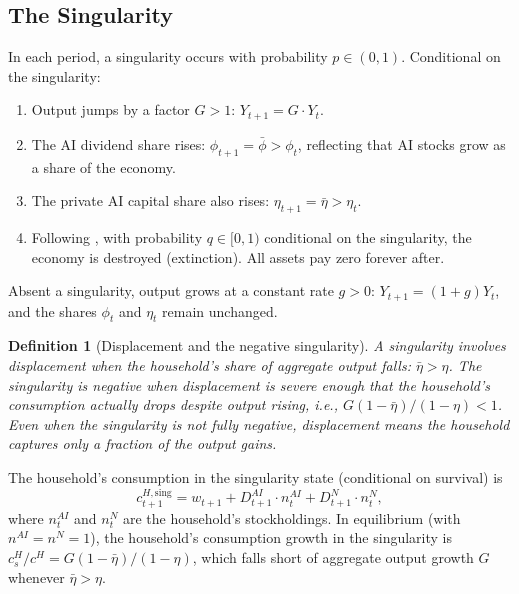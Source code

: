 \documentclass[12pt]{article}
\newtheorem{definition}{Definition}
\begin{document}
\subsection{The Singularity}

In each period, a singularity occurs with probability $p \in (0,1)$. Conditional on the singularity:

\begin{enumerate}
    \item Output jumps by a factor $G > 1$: $Y_{t+1} = G \cdot Y_t$.

    \item The AI dividend share rises: $\phi_{t+1} = \bar{\phi} > \phi_t$, reflecting that AI stocks grow as a share of the economy.

    \item The private AI capital share also rises: $\eta_{t+1} = \bar{\eta} > \eta_t$.

    \item Following \citet{Jones2024}, with probability $q \in [0,1)$ conditional on the singularity, the economy is destroyed (extinction). All assets pay zero forever after.
\end{enumerate}

Absent a singularity, output grows at a constant rate $g > 0$: $Y_{t+1} = (1+g) Y_t$, and the shares $\phi_t$ and $\eta_t$ remain unchanged.

\begin{definition}[Displacement and the negative singularity]
A singularity involves \emph{displacement} when the household's share of aggregate output falls: $\bar{\eta} > \eta$. The singularity is \emph{negative} when displacement is severe enough that the household's consumption actually drops despite output rising, i.e., $G(1 - \bar{\eta})/(1 - \eta) < 1$. Even when the singularity is not fully negative, displacement means the household captures only a fraction of the output gains.
\end{definition}

The household's consumption in the singularity state (conditional on survival) is
\begin{equation}
    c_{t+1}^{H,\text{sing}} = w_{t+1} + D_{t+1}^{AI} \cdot n_t^{AI} + D_{t+1}^{N} \cdot n_t^{N}, \label{eq:hh_cons_sing}
\end{equation}
where $n_t^{AI}$ and $n_t^{N}$ are the household's stockholdings. In equilibrium (with $n^{AI} = n^N = 1$), the household's consumption growth in the singularity is $c_s^H / c^H = G(1 - \bar{\eta})/(1 - \eta)$, which falls short of aggregate output growth $G$ whenever $\bar{\eta} > \eta$.
\end{document}
